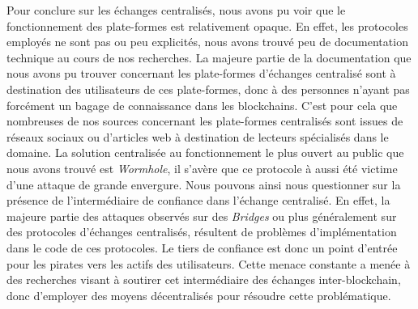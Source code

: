 Pour conclure sur les échanges centralisés, nous avons pu voir que le fonctionnement des plate-formes est relativement opaque. 
En effet, les protocoles employés ne sont pas ou peu explicités, nous avons trouvé peu de documentation technique au cours de nos recherches. 
La majeure partie de la documentation que nous avons pu trouver concernant les plate-formes d'échanges centralisé sont à destination des utilisateurs de ces plate-formes, donc à des personnes n'ayant pas forcément un bagage de connaissance dans les blockchains. 
C'est pour cela que nombreuses de nos sources concernant les plate-formes centralisés sont issues de réseaux sociaux ou d'articles web à destination de lecteurs spécialisés dans le domaine. 
La solution centralisée au fonctionnement le plus ouvert au public que nous avons trouvé est \textit{Wormhole}, il s'avère que ce protocole à aussi été victime d'une attaque de grande envergure. 
Nous pouvons ainsi nous questionner sur la présence de l'intermédiaire de confiance dans l'échange centralisé. 
En effet, la majeure partie des attaques observés sur des \textit{Bridges} ou plus généralement sur des protocoles d'échanges centralisés, résultent de problèmes d'implémentation dans le code de ces protocoles. 
Le tiers de confiance est donc un point d'entrée pour les pirates vers les actifs des utilisateurs. 
Cette menace constante a menée à des recherches visant à soutirer cet intermédiaire des échanges inter-blockchain, donc d'employer des moyens décentralisés pour résoudre cette problématique. 